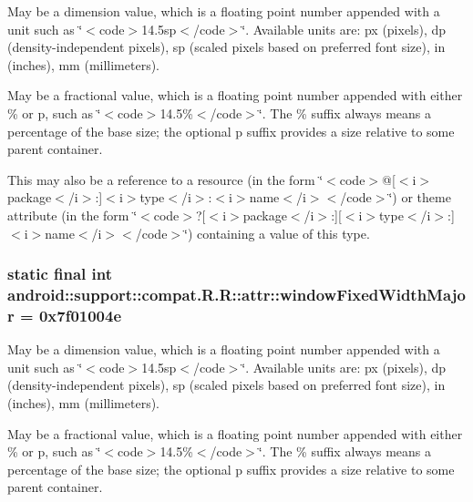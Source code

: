 May be a dimension value, which is a floating point number appended with a unit such as \char`\"{}$<$code$>$14.5sp$<$/code$>$\char`\"{}. Available units are: px (pixels), dp (density-independent pixels), sp (scaled pixels based on preferred font size), in (inches), mm (millimeters). 

May be a fractional value, which is a floating point number appended with either \% or p, such as \char`\"{}$<$code$>$14.5\%$<$/code$>$\char`\"{}. The \% suffix always means a percentage of the base size; the optional p suffix provides a size relative to some parent container. 

This may also be a reference to a resource (in the form \char`\"{}$<$code$>$@\mbox{[}$<$i$>$package$<$/i$>$:\mbox{]}$<$i$>$type$<$/i$>$:$<$i$>$name$<$/i$>$$<$/code$>$\char`\"{}) or theme attribute (in the form \char`\"{}$<$code$>$?\mbox{[}$<$i$>$package$<$/i$>$:\mbox{]}\mbox{[}$<$i$>$type$<$/i$>$:\mbox{]}$<$i$>$name$<$/i$>$$<$/code$>$\char`\"{}) containing a value of this type. \hypertarget{classandroid_1_1support_1_1compat_1_1_r_1_1attr_10dd3689e17a6e96b12952dc0eb49b07}{
\subsubsection[{windowFixedWidthMajor}]{\setlength{\rightskip}{0pt plus 5cm}static final int android::support::compat.R.R::attr::windowFixedWidthMajor = 0x7f01004e}}
\label{classandroid_1_1support_1_1compat_1_1_r_1_1attr_10dd3689e17a6e96b12952dc0eb49b07}


May be a dimension value, which is a floating point number appended with a unit such as \char`\"{}$<$code$>$14.5sp$<$/code$>$\char`\"{}. Available units are: px (pixels), dp (density-independent pixels), sp (scaled pixels based on preferred font size), in (inches), mm (millimeters). 

May be a fractional value, which is a floating point number appended with either \% or p, such as \char`\"{}$<$code$>$14.5\%$<$/code$>$\char`\"{}. The \% suffix always means a percentage of the base size; the optional p suffix provides a size relative to some parent container. 

